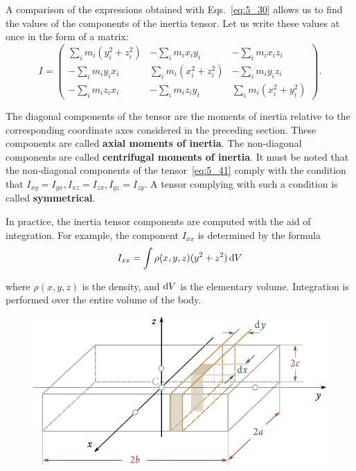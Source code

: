 A comparison of the expressions obtained with Eqs.~\eqref{eq:5_30} allows us to find the values of the components of the inertia tensor. Let us write these values at once in the form of a matrix:
\begin{equation}\label{eq:5_41}
	I = \begin{pmatrix}
		\displaystyle\sum_i m_i(y_i^2+z_i^2) & -\displaystyle\sum_i m_i x_i y_i & -\displaystyle\sum_i m_i x_i z_i\\
		-\displaystyle\sum_i m_i y_i x_i & \displaystyle\sum_i m_i (x_i^2+z_i^2) & -\displaystyle\sum_i m_i y_i z_i\\
		-\displaystyle\sum_i m_i z_i x_i & -\displaystyle\sum_i m_i z_i y_i & \displaystyle\sum_i m_i (x_i^2+y_i^2)
	\end{pmatrix}.
\end{equation}

\noindent
The diagonal components of the tensor are the moments of inertia relative to the corresponding coordinate axes considered in the preceding section. These components are called \textbf{axial moments of inertia}. The non-diagonal components are called \textbf{centrifugal moments of inertia}. It must be noted that the non-diagonal components of the tensor~\eqref{eq:5_41} comply with the condition that $I_{xy}=I_{yx}, I_{xz}=I_{zx}, I_{yz}=I_{zy}$. A tensor complying with such a condition is called \textbf{symmetrical}.

In practice, the inertia tensor components are computed with the aid of integration. For example, the component $I_{xx}$ is determined by the formula
\begin{equation*}
	I_{xx} = \int \rho(x,y,z)(y^2+z^2)\,\mathrm{d} V
\end{equation*}

\noindent
where $\rho(x,y,z)$ is the density, and $\mathrm{d} V$ is the elementary volume. Integration is performed over the entire volume of the body.

\begin{figure}[t]
	\begin{center}
		\includegraphics[scale=0.8]{figures/ch_05/fig_5_17.pdf}
		\caption[]{}
		\label{fig:5_17}
	\end{center}
\vspace{-1.0cm}
\end{figure}

